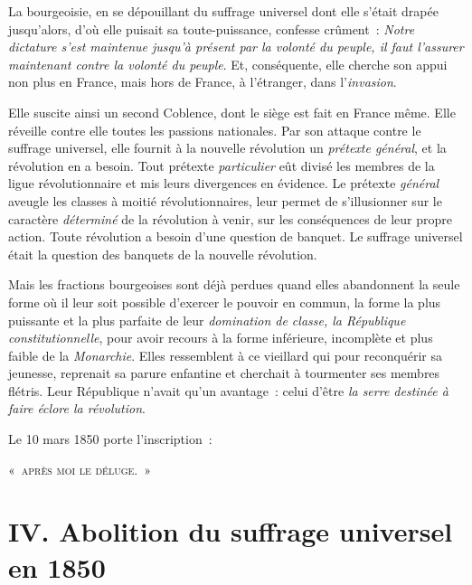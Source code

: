 \documentclass[twoside]{book} %
\newcommand\chapteropen{} %
\newcommand\chapterclose{} %
\begin{document}
La bourgeoisie, en se dépouillant du suffrage universel dont elle s’était drapée jusqu’alors, d’où elle puisait sa toute-puissance, confesse crûment : \emph{Notre dictature s’est maintenue jusqu’à présent par la volonté du peuple, il faut l’assurer maintenant contre la volonté du peuple}. Et, conséquente, elle cherche son appui non plus en France, mais hors de France, à l’étranger, dans l’\emph{invasion}.\par
Elle suscite ainsi un second Coblence, dont le siège est fait en France même. Elle réveille contre elle toutes les passions nationales. Par son attaque contre le suffrage universel, elle fournit à la nouvelle révolution un \emph{prétexte général}, et la révolution en a besoin. Tout prétexte \emph{particulier} eût divisé les membres de la ligue révolutionnaire et mis leurs divergences en évidence. Le prétexte \emph{général} aveugle les classes à moitié révolutionnaires, leur permet de s’illusionner sur le caractère \emph{déterminé} de la révolution à venir, sur les conséquences de leur propre action. Toute révolution a besoin d’une question de banquet. Le suffrage universel était la question des banquets de la nouvelle révolution.\par
Mais les fractions bourgeoises sont déjà perdues quand elles abandonnent la seule forme où il leur soit possible d’exercer le pouvoir en commun, la forme la plus puissante et la plus parfaite de leur \emph{domination de classe, la République constitutionnelle}, pour avoir recours à la forme inférieure, incomplète et plus faible de la \emph{Monarchie}. Elles ressemblent à ce vieillard qui pour reconquérir sa jeunesse, reprenait sa parure enfantine et cherchait à tourmenter ses membres flétris. Leur République n’avait qu’un avantage : celui d’être \emph{la serre destinée à faire éclore la révolution}.\par
Le 10 mars 1850 porte l’inscription :\par
{\centering \noindent « {\scshape après moi le déluge}. »\par}
\chapterclose


\chapteropen

\chapter[{IV. Abolition du suffrage universel en 1850}]{IV. Abolition du suffrage universel en 1850}
\renewcommand{\leftmark}{IV. Abolition du suffrage universel en 1850}
\end{document}

